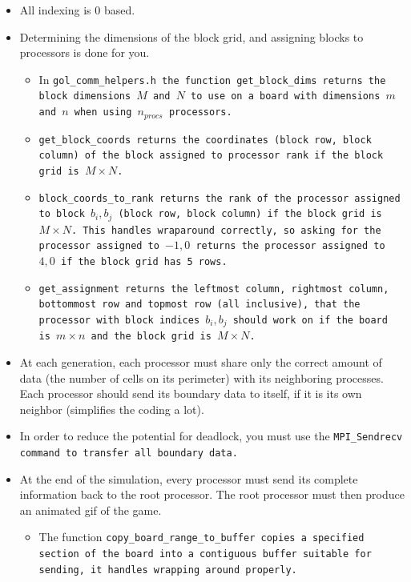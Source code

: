 \documentclass{article}
\begin{document}
\begin{enumerate}
\begin{itemize}
\item All indexing is 0 based. 

\item Determining the dimensions of the block grid, and assigning
  blocks to processors is done for you.
  \begin{itemize}
  \item   In \tt{gol\_comm\_helpers.h}
  the function \tt{get\_block\_dims} returns the block dimensions $M$
  and $N$ to use on a board with dimensions $m$ and $n$ when using
  $n_{procs}$ processors. 

\item \tt{get\_block\_coords} returns the coordinates (block row,
  block column) of the block assigned to processor \tt{rank} if the
  block grid is $M \times N$.

\item \tt{block\_coords\_to\_rank} returns the rank of the processor
  assigned to block $b_i, b_j$ (block row, block column) if the block
  grid is $M \times N$.  This handles wraparound correctly, so asking
  for the processor assigned to $-1,0$ returns the processor assigned
  to $4,0$ if the block grid has 5 rows.   

\item \tt{get\_assignment} returns the leftmost column, rightmost
  column, bottommost row and topmost row (all inclusive), that the
  processor with block indices $b_i,b_j$ should work on if the board
  is $m\times n$ and the block grid is $M\times N$. 
  \end{itemize}

\item At each generation, each processor must share only the correct
  amount of data (the number of cells on its perimeter) with its
  neighboring processes.  Each processor should send its boundary data
  to itself, if it is its own neighbor (simplifies the coding a lot). 

\item In order to reduce the potential for deadlock, you must use the
  \tt{MPI\_Sendrecv} command to transfer all boundary data. 

\item At the end of the simulation, every processor must send its
  complete information back to the root processor.  The root processor
  must then produce an animated gif of the game. 
  \begin{itemize}
  \item The function \tt{copy\_board\_range\_to\_buffer} copies a
    specified section of the board into a contiguous buffer suitable
    for sending, it handles wrapping around properly. 


\end{itemize}
\end{itemize}
\end{enumerate}
\end{document}
